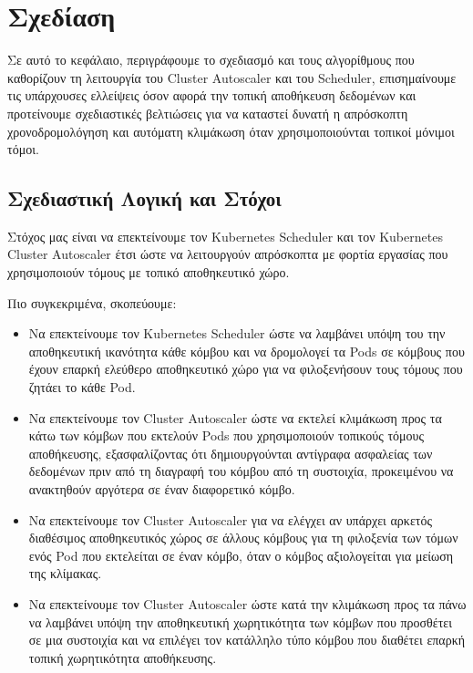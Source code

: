 \chapter{Σχεδίαση} \label{chapter:gr-design}

Σε αυτό το κεφάλαιο, περιγράφουμε το σχεδιασμό και τους αλγορίθμους που καθορίζουν τη
λειτουργία του Cluster Autoscaler και του Scheduler, επισημαίνουμε τις
υπάρχουσες ελλείψεις όσον αφορά την τοπική αποθήκευση δεδομένων και προτείνουμε σχεδιαστικές
βελτιώσεις για να καταστεί δυνατή η απρόσκοπτη χρονοδρομολόγηση και αυτόματη κλιμάκωση όταν
χρησιμοποιούνται τοπικοί μόνιμοι τόμοι.

\section{Σχεδιαστική Λογική και Στόχοι}

Στόχος μας είναι να επεκτείνουμε
τον Kubernetes Scheduler και τον Kubernetes Cluster Autoscaler έτσι ώστε να
λειτουργούν απρόσκοπτα με φορτία εργασίας που χρησιμοποιούν τόμους με τοπικό αποθηκευτικό χώρο.

Πιο συγκεκριμένα, σκοπεύουμε:
\begin{itemize}
    \tightlist
    \item Να επεκτείνουμε τον Kubernetes Scheduler ώστε να λαμβάνει υπόψη του την
    αποθηκευτική ικανότητα κάθε κόμβου και να δρομολογεί τα Pods σε κόμβους που έχουν
    επαρκή ελεύθερο αποθηκευτικό χώρο για να φιλοξενήσουν τους τόμους που ζητάει το κάθε Pod.
    \item Να επεκτείνουμε τον Cluster Autoscaler ώστε να εκτελεί κλιμάκωση προς τα κάτω των κόμβων που εκτελούν Pods
    που χρησιμοποιούν τοπικούς τόμους αποθήκευσης, εξασφαλίζοντας ότι δημιουργούνται αντίγραφα ασφαλείας των δεδομένων
    πριν από τη διαγραφή του κόμβου από τη συστοιχία, προκειμένου να ανακτηθούν αργότερα σε
    έναν διαφορετικό κόμβο.
    \item Να επεκτείνουμε τον Cluster Autoscaler για να ελέγχει αν υπάρχει
    αρκετός διαθέσιμος αποθηκευτικός χώρος σε άλλους κόμβους για τη φιλοξενία
    των τόμων ενός Pod που εκτελείται σε έναν κόμβο, όταν ο κόμβος αξιολογείται
    για μείωση της κλίμακας.
    \item Να επεκτείνουμε τον Cluster Autoscaler ώστε κατά την κλιμάκωση προς τα πάνω να λαμβάνει υπόψη την αποθηκευτική
    χωρητικότητα των κόμβων που προσθέτει σε μια συστοιχία και να επιλέγει τον κατάλληλο
    τύπο κόμβου που διαθέτει επαρκή τοπική χωρητικότητα αποθήκευσης.
\end{itemize}




